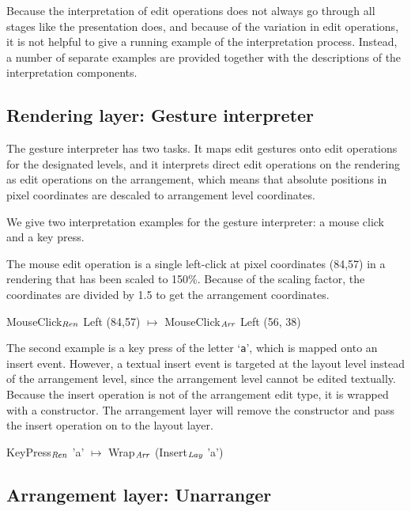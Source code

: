 \documentclass{speauth}
\begin{document}
Because the interpretation of edit operations does not always go through all stages like the presentation does, and because of the variation in edit operations, it is not helpful to give a running example of the interpretation process. Instead, a number of separate examples are provided together with the descriptions of the interpretation components.

%																
\subsection{Rendering layer: Gesture interpreter} \label{sect:gestureInterpreter}

The gesture interpreter has two tasks. It maps edit gestures onto edit operations for the designated levels, and it interprets direct edit operations on the rendering as edit operations on the arrangement, which means that absolute positions in pixel coordinates are descaled to arrangement level coordinates. 

We give two interpretation examples for the gesture interpreter: a mouse click and a key press. 

The mouse edit operation is a single left-click at pixel coordinates (84,57) in a rendering that has been scaled to 150\%.
Because of the scaling factor, the coordinates are divided by 1.5 to get the arrangement coordinates.

\ttfamily
MouseClick$_{\mathit{Ren}}$ Left (84,57) $\mapsto$ MouseClick$_{\mathit{Arr}}$ Left (56, 38)\\
\rmfamily

The second example is a key press of the letter `\verb|a|', which is mapped onto an insert event. However, a textual insert event is targeted at the layout level instead of the arrangement level, since the arrangement level cannot be edited textually. Because the insert operation is not of the arrangement edit type, it is wrapped with a  constructor. The arrangement layer will remove the  constructor and pass the insert operation on to the layout layer.

\ttfamily
KeyPress$_{\mathit{Ren}}$ 'a' $\mapsto$ Wrap$_{\mathit{Arr}}$ (Insert$_{\mathit{Lay}}$ 'a')
\rmfamily


%																
\subsection{Arrangement layer: Unarranger}
\end{document}

